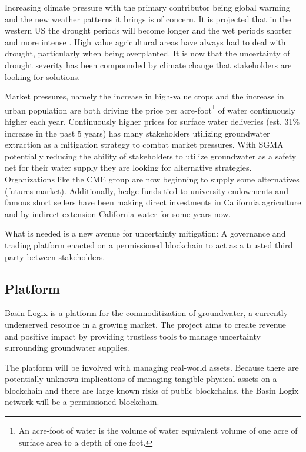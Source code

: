 \documentclass{tufte-handout}
\begin{document}
Increasing climate pressure with the primary contributor being global warming and the new weather patterns it brings is of concern. It is projected that in the western US the drought periods will become longer and the wet periods shorter and more intense \cite{Diffenbaugh2020}. High value agricultural areas have always had to deal with drought, particularly when being overplanted. It is now that the uncertainty of drought severity has been compounded by climate change that stakeholders are looking for solutions. 

Market pressures, namely the increase in high-value crops and the increase in urban population are both driving the price per acre-foot\footnote{An acre-foot of water is the volume of water equivalent volume of one acre of surface area to a depth of one foot.} of water continuously higher each year. Continuously higher prices for surface water deliveries (est. 31\% increase in the past 5 years)\cite{value} has many stakeholders utilizing groundwater extraction as a mitigation strategy to combat market pressures. With SGMA potentially reducing the ability of stakeholders to utilize groundwater as a safety net for their water supply they are looking for alternative strategies. Organizations like the CME group are now beginning to supply some alternatives (futures market). Additionally, hedge-funds tied to university endowments\cite{harvard} and famous short sellers\cite{burry} have been making direct investments in California agriculture and by indirect extension California water for some years now.

What is needed is a new avenue for uncertainty mitigation: \break A governance and trading platform enacted on a permissioned blockchain to act as a trusted third party between stakeholders. 

\subsection{Platform}\label{sec:headings}

Basin Logix is a platform for the commoditization of groundwater, a currently underserved resource in a growing market. The project aims to create revenue and positive impact by providing trustless tools to manage uncertainty surrounding groundwater supplies. 

The platform will be involved with managing real-world assets. Because there are potentially unknown implications of managing tangible physical assets on a blockchain and there are large known risks of public blockchains, the Basin Logix network will be a permissioned blockchain.
\end{document}
